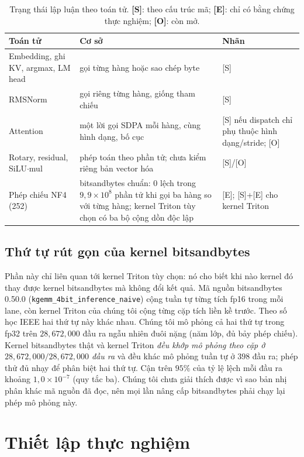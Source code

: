 \documentclass[a4paper,11pt]{article}
\begin{document}
\begin{table}[t]
\centering\small
\caption{Trạng thái lập luận theo toán tử. \textbf{[S]}: theo cấu trúc mã; \textbf{[E]}: chỉ có bằng chứng thực nghiệm; \textbf{[O]}: còn mở.}\label{tab:ops}
\begin{tabularx}{\textwidth}{@{}p{}Xp{}@{}}
\toprule
Toán tử & Cơ sở & Nhãn\\\midrule
Embedding, ghi KV, argmax, LM head & gọi từng hàng hoặc sao chép byte & [S]\\
RMSNorm & gọi riêng từng hàng, giống tham chiếu & [S]\\
Attention & một lời gọi SDPA mỗi hàng, cùng hình dạng, bố cục & [S] nếu dispatch chỉ phụ thuộc hình dạng/stride; [O]\\
Rotary, residual, SiLU$\cdot$mul & phép toán theo phần tử; chưa kiểm riêng bản vector hóa & [S]/[O]\\
Phép chiếu NF4 (252) & bitsandbytes chuẩn: $0$ lệch trong $9{,}9\times10^{8}$ phần tử khi gọi ba hàng so với từng hàng; kernel Triton tùy chọn có ba bộ cộng dồn độc lập & [E]; [S]+[E] cho kernel Triton\\
\bottomrule
\end{tabularx}
\end{table}

\subsection{Thứ tự rút gọn của kernel bitsandbytes}\label{sec:order}
Phần này chỉ liên quan tới kernel Triton tùy chọn: nó cho biết khi nào kernel đó thay được kernel bitsandbytes mà không đổi kết quả.
Mã nguồn bitsandbytes 0.50.0 (\texttt{kgemm\_\allowbreak 4bit\_\allowbreak inference\_\allowbreak naive}) cộng tuần tự từng tích fp16 trong mỗi lane, còn kernel Triton của chúng tôi cộng từng cặp tích liền kề trước. Theo số học IEEE hai thứ tự này khác nhau. Chúng tôi mô phỏng cả hai thứ tự trong fp32 trên $28{,}672{,}000$ đầu ra ngẫu nhiên đuôi nặng (năm lớp, đủ bảy phép chiếu). Kernel bitsandbytes thật và kernel Triton \emph{đều khớp mô phỏng theo cặp ở $28{,}672{,}000/28{,}672{,}000$ đầu ra} và đều khác mô phỏng tuần tự ở $398$ đầu ra; phép thử đủ nhạy để phân biệt hai thứ tự. Cận trên $95\%$ của tỷ lệ lệch mỗi đầu ra khoảng $1{,}0\times10^{-7}$ (quy tắc ba). Chúng tôi chưa giải thích được vì sao bản nhị phân khác mã nguồn đã đọc, nên mọi lần nâng cấp bitsandbytes phải chạy lại phép mô phỏng này.

\section{Thiết lập thực nghiệm}
\end{document}
